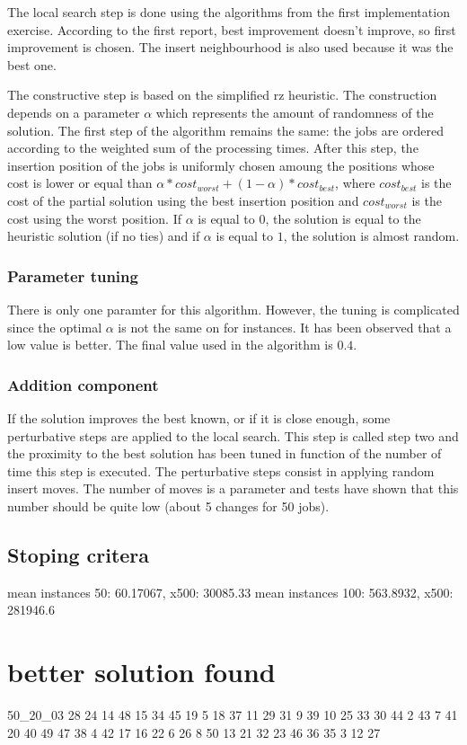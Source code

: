 \documentclass{article}
\begin{document}
The local search step is done using the algorithms from the first implementation exercise.
According to the first report, best improvement doesn't improve, so first improvement is chosen.
The insert neighbourhood is also used because it was the best one.\newline

The constructive step is based on the simplified rz heuristic.
The construction depends on a parameter $\alpha$ which represents the amount of randomness of the solution.
The first step of the algorithm remains the same: the jobs are ordered according to the weighted sum of the processing times.
After this step, the insertion position of the jobs is uniformly chosen amoung the positions whose cost is lower or equal than $\alpha*cost_{worst} + (1-\alpha)*cost_{best}$, where $cost_{best}$ is the cost of the partial solution using the best insertion position and $cost_{worst}$ is the cost using the worst position.
If $\alpha$ is equal to $0$, the solution is equal to the heuristic solution (if no ties) and if $\alpha$ is equal to $1$, the solution is almost random.

\subsubsection{Parameter tuning}

There is only one paramter for this algorithm.
However, the tuning is complicated since the optimal $\alpha$ is not the same on for instances.
It has been observed that a low value is better.
The final value used in the algorithm is $0.4$. 

\subsubsection{Addition component}

If the solution improves the best known, or if it is close enough, some perturbative steps are applied to the local search.
This step is called step two and the proximity to the best solution has been tuned in function of the number of time this step is executed.
The perturbative steps consist in applying random insert moves.
The number of moves is a parameter and tests have shown that this number should be quite low (about 5 changes for 50 jobs).

\subsection{Stoping critera}

mean instances 50: 60.17067, x500: 30085.33\newline
mean instances 100: 563.8932, x500: 281946.6



\section{better solution found}

50\_20\_03  28 24 14 48 15 34 45 19 5 18 37 11 29 31 9 39 10 25 33 30 44 2 43 7 41 20 40 49 47 38 4 42 17 16 22 6 26 8 50 13 21 32 23 46 36 35 3 12 27 
\end{document}
